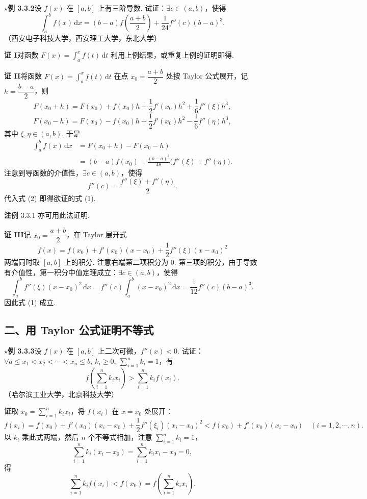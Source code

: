 \documentclass[UTF8,12pt,a4paper,fontset=fandol]{ctexart}
\begin{document}
\noindent\textbf{$\star$例 3.3.2}\quad 设 $f(x)$ 在 $[a,b]$ 上有三阶导数. 试证：$\exists c\in(a,b)$，使得
\begin{equation}
  \int_a^b f(x)\,\mathrm dx
  =(b-a)f\left(\frac{a+b}{2}\right)+\frac1{24}f''(c)(b-a)^3.
\tag{1}
\end{equation}
（西安电子科技大学，西安理工大学，东北大学）

\noindent\textbf{证 I}\quad 对函数 $F(x)=\int_a^x f(t)\,\mathrm dt$ 利用上例结果，或重复上例的证明即得.

\noindent\textbf{证 II}\quad 将函数 $F(x)=\int_a^x f(t)\,\mathrm dt$ 在点 $x_0=\dfrac{a+b}{2}$ 处按 Taylor 公式展开，记 $h=\dfrac{b-a}{2}$，则
\[
  F(x_0+h)=F(x_0)+f(x_0)h+\frac12f'(x_0)h^2+\frac16f''(\xi)h^3,
\]
\[
  F(x_0-h)=F(x_0)-f(x_0)h+\frac12f'(x_0)h^2-\frac16f''(\eta)h^3,
\]
其中 $\xi,\eta\in(a,b)$. 于是
\[
\begin{aligned}
\int_a^b f(x)\,\mathrm dx
&=F(x_0+h)-F(x_0-h)\\
&=(b-a)f(x_0)+\frac{(b-a)^3}{48}\bigl(f''(\xi)+f''(\eta)\bigr).
\end{aligned}
\tag{2}
\]
注意到导函数的介值性，$\exists c\in(a,b)$，使得
\[
  f''(c)=\frac{f''(\xi)+f''(\eta)}2.
\]
代入式 (2) 即得欲证的式 (1).

\noindent\textbf{注}\quad 例 3.3.1 亦可用此法证明.

\noindent\textbf{证 III}\quad 记 $x_0=\dfrac{a+b}{2}$，在 Taylor 展开式
\[
  f(x)=f(x_0)+f'(x_0)(x-x_0)+\frac12f''(\xi)(x-x_0)^2
\]
两端同时取 $[a,b]$ 上的积分. 注意右端第二项积分为 0. 第三项的积分，由于导数有介值性，第一积分中值定理成立：$\exists c\in(a,b)$，使得
\[
  \int_a^b f''(\xi)(x-x_0)^2\,\mathrm dx
  =
  f''(c)\int_a^b (x-x_0)^2\,\mathrm dx
  =
  \frac1{12}f''(c)(b-a)^3.
\]
因此式 (1) 成立.

\subsection*{二、用 Taylor 公式证明不等式}

\noindent\textbf{$\star$例 3.3.3}\quad 设 $f(x)$ 在 $[a,b]$ 上二次可微，$f''(x)<0$. 试证：$\forall a\le x_1<x_2<\cdots<x_n\le b,\ k_i\ge0,\ \sum\limits_{i=1}^n k_i=1$，有
\[
  f\left(\sum_{i=1}^n k_ix_i\right)>\sum_{i=1}^n k_if(x_i).
\]
（哈尔滨工业大学，北京科技大学）

\noindent\textbf{证}\quad 取 $x_0=\sum\limits_{i=1}^n k_ix_i$，将 $f(x_i)$ 在 $x=x_0$ 处展开：
\[
  f(x_i)=f(x_0)+f'(x_0)(x_i-x_0)+\frac12f''(\xi_i)(x_i-x_0)^2
  <f(x_0)+f'(x_0)(x_i-x_0)\quad(i=1,2,\cdots,n).
\]
以 $k_i$ 乘此式两端，然后 $n$ 个不等式相加，注意 $\sum\limits_{i=1}^n k_i=1$，
\[
  \sum_{i=1}^n k_i(x_i-x_0)=\sum_{i=1}^n k_ix_i-x_0=0,
\]
得
\[
  \sum_{i=1}^n k_if(x_i)<f(x_0)=f\left(\sum_{i=1}^n k_ix_i\right).
\]
\end{document}
